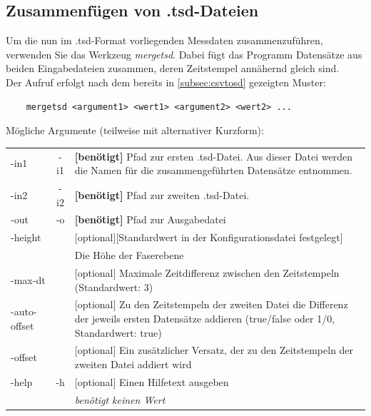 \documentclass[10pt,a5paper,twoside,titlepage]{scrartcl}
\begin{document}
	\subsection{Zusammenfügen von .tsd-Dateien}
	\label{subsec:mergetsd}
	Um die nun im .tsd-Format vorliegenden Messdaten zusammenzuführen, verwenden Sie das Werkzeug \emph{mergetsd}. Dabei fügt das Programm Datensätze aus beiden Eingabedateien zusammen, deren Zeitstempel annähernd gleich sind.\\
	Der Aufruf erfolgt nach dem bereits in \ref{subsec:csvtosd} gezeigten Muster:
	\begin{lstlisting}
	mergetsd <argument1> <wert1> <argument2> <wert2> ...
	\end{lstlisting}
	Mögliche Argumente (teilweise mit alternativer Kurzform):\\
	
	\begin{tabular}{p{}c|p{}}
	-in1 & -i1 & \textbf{[benötigt]} Pfad zur ersten .tsd-Datei. Aus dieser Datei werden die Namen für die zusammengeführten Datensätze entnommen.\\
	-in2 & -i2 & \textbf{[benötigt]} Pfad zur zweiten .tsd-Datei.\\
	-out & -o & \textbf{[benötigt]} Pfad zur Ausgabedatei\\
	-height & & [optional][Standardwert in der Konfigurationsdatei festgelegt]\\&& Die Höhe der Faserebene\\
	-max-dt & & [optional] Maximale Zeitdifferenz zwischen den Zeitstempeln (Standardwert: 3)\\
	-auto-offset & & [optional] Zu den Zeitstempeln der zweiten Datei die Differenz der jeweils ersten Datensätze addieren (true/false oder 1/0, Standardwert: true)\\
	-offset & & [optional] Ein zusätzlicher Versatz, der zu den Zeitstempeln der zweiten Datei addiert wird\\
	-help & -h & [optional] Einen Hilfetext ausgeben \\
	&&\emph{benötigt keinen Wert}
	\end{tabular}\\
	\newpage
\end{document}
